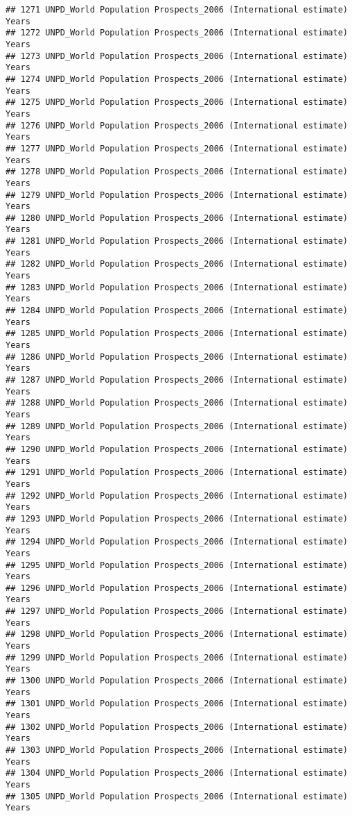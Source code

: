 \documentclass[]{article}
\begin{document}
\begin{verbatim}
## 1271 UNPD_World Population Prospects_2006 (International estimate) Years
## 1272 UNPD_World Population Prospects_2006 (International estimate) Years
## 1273 UNPD_World Population Prospects_2006 (International estimate) Years
## 1274 UNPD_World Population Prospects_2006 (International estimate) Years
## 1275 UNPD_World Population Prospects_2006 (International estimate) Years
## 1276 UNPD_World Population Prospects_2006 (International estimate) Years
## 1277 UNPD_World Population Prospects_2006 (International estimate) Years
## 1278 UNPD_World Population Prospects_2006 (International estimate) Years
## 1279 UNPD_World Population Prospects_2006 (International estimate) Years
## 1280 UNPD_World Population Prospects_2006 (International estimate) Years
## 1281 UNPD_World Population Prospects_2006 (International estimate) Years
## 1282 UNPD_World Population Prospects_2006 (International estimate) Years
## 1283 UNPD_World Population Prospects_2006 (International estimate) Years
## 1284 UNPD_World Population Prospects_2006 (International estimate) Years
## 1285 UNPD_World Population Prospects_2006 (International estimate) Years
## 1286 UNPD_World Population Prospects_2006 (International estimate) Years
## 1287 UNPD_World Population Prospects_2006 (International estimate) Years
## 1288 UNPD_World Population Prospects_2006 (International estimate) Years
## 1289 UNPD_World Population Prospects_2006 (International estimate) Years
## 1290 UNPD_World Population Prospects_2006 (International estimate) Years
## 1291 UNPD_World Population Prospects_2006 (International estimate) Years
## 1292 UNPD_World Population Prospects_2006 (International estimate) Years
## 1293 UNPD_World Population Prospects_2006 (International estimate) Years
## 1294 UNPD_World Population Prospects_2006 (International estimate) Years
## 1295 UNPD_World Population Prospects_2006 (International estimate) Years
## 1296 UNPD_World Population Prospects_2006 (International estimate) Years
## 1297 UNPD_World Population Prospects_2006 (International estimate) Years
## 1298 UNPD_World Population Prospects_2006 (International estimate) Years
## 1299 UNPD_World Population Prospects_2006 (International estimate) Years
## 1300 UNPD_World Population Prospects_2006 (International estimate) Years
## 1301 UNPD_World Population Prospects_2006 (International estimate) Years
## 1302 UNPD_World Population Prospects_2006 (International estimate) Years
## 1303 UNPD_World Population Prospects_2006 (International estimate) Years
## 1304 UNPD_World Population Prospects_2006 (International estimate) Years
## 1305 UNPD_World Population Prospects_2006 (International estimate) Years

\end{verbatim}
\end{document}
